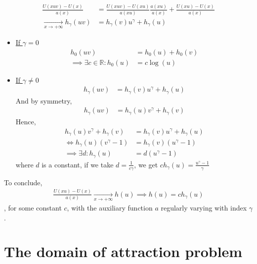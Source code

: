 \begin{equation}
\begin{alignat*}{2}
\frac{U(x u v) - U(x)}{a(x)} &= \frac{U(x u v) - U(x u)}{a(x u)} \frac{a(x u)}{a(x)} + \frac{U(x u) - U(x)}{a(x)} \\
\xrightarrow[x \rightarrow + \infty]{} h_\gamma(u v) &= h_\gamma(v) u^\gamma + h_\gamma(u)
\end{alignat*}
\end{equation}
\begin{itemize}
	\item \underline{If $\gamma = 0$} \\
	\begin{equation}
	\begin{alignat*}{2}
	h_0(u v) &= h_0(u) + h_0(v) \\
	\implies \exists c \in \mathbb{R} : h_0(u) &= c \log(u)
	\end{alignat*}
	\end{equation}\newline
	\item \underline{If $\gamma \ne 0$}
		\begin{equation}
		\begin{alignat*}{2}
		h_\gamma(u v) &= h_\gamma(v) u^\gamma + h_\gamma(u)
		\end{alignat*}
		\end{equation} And by symmetry,
		\begin{equation}
		\begin{alignat*}{2}
		h_\gamma(u v) &= h_\gamma(u) v^\gamma + h_\gamma(v)
		\end{alignat*}
		\end{equation} Hence,
		\begin{equation}
		\begin{alignat*}{2}
		h_\gamma(u) v^\gamma + h_\gamma(v) &= h_\gamma(v) u^\gamma + h_\gamma(u) \\
		\iff h_\gamma(u) (v^\gamma - 1) &= h_\gamma(v) (u^\gamma - 1) \\
		\implies \exists d : h_\gamma(u) &= d (u^\gamma - 1)
		\end{alignat*}
		\end{equation} where $d$ is a constant, if we take $d = \frac{1}{c \gamma}$, we get $c h_\gamma(u) = \frac{u^\gamma - 1}{\gamma}$
\end{itemize}
To conclude,
\begin{equation}
\begin{alignat*}{2}
\frac{U(x u) - U(x)}{a(x)} \xrightarrow[x \rightarrow + \infty]{} h(u)
\implies h(u) = c h_\gamma(u)
\end{alignat*}
\end{equation}, for some constant $c$, with the auxiliary function $a$ regularly varying with index $\gamma$.


\section{The domain of attraction problem}





